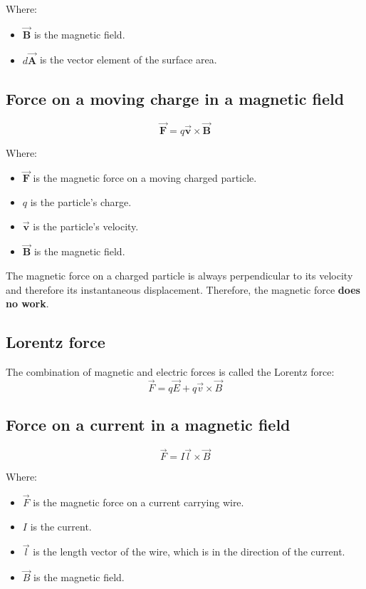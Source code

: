 \documentclass[11pt]{article}
\begin{document}
Where:
\begin{itemize}
\item \(\vec{\boldsymbol{B}}\) is the magnetic field.
\item \(d \vec{\boldsymbol{A}}\) is the vector element of the surface area.
\end{itemize}

\newpage

\subsection{Force on a moving charge in a magnetic field}
\label{sec:org7416b15}
\[\vec{\boldsymbol{F}} = q \vec{\boldsymbol{v}} \times \vec{\boldsymbol{B}}\]

Where:
\begin{itemize}
\item \(\vec{\boldsymbol{F}}\) is the magnetic force on a moving charged particle.
\item \(q\) is the particle's charge.
\item \(\vec{\boldsymbol{v}}\) is the particle's velocity.
\item \(\vec{\boldsymbol{B}}\) is the magnetic field.
\end{itemize}

The magnetic force on a charged particle is always perpendicular to its velocity and therefore its instantaneous displacement. Therefore, the magnetic force \textbf{does no work}.

\subsection{Lorentz force}
\label{sec:org823b419}
The combination of magnetic and electric forces is called the Lorentz force:
\[\vec{F} = q \vec{E} + q \vec{v} \times \vec{B}\]

\subsection{Force on a current in a magnetic field}
\label{sec:org2d7f624}
\[\vec{F} = I \vec{l} \times \vec{B}\]

Where:
\begin{itemize}
\item \(\vec{F}\) is the magnetic force on a current carrying wire.
\item \(I\) is the current.
\item \(\vec{l}\) is the length vector of the wire, which is in the direction of the current.
\item \(\vec{B}\) is the magnetic field.
\end{itemize}
\end{document}
